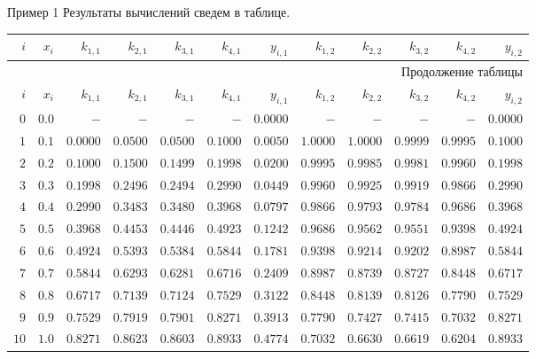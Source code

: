\documentclass[aspectratio=169, mathserif]{beamer}	%
\begin{document}
\begin{frame}[fragile, label=c]{Пример 1}
\scriptsize
Результаты вычислений сведем в таблице.
\vfill
\begin{longtable}{|r|r|r|r|r|r|r|r|r|r|r|r|}

	\hline
	\multicolumn{1}{|r|}{$i$} & \multicolumn{1}{r|}{$x_i$} & \multicolumn{1}{r|}{$k_{1,1}$} & \multicolumn{1}{r|}{$k_{2,1}$} & \multicolumn{1}{r|}{$k_{3,1}$} & \multicolumn{1}{r|}{$k_{4,1}$} & \multicolumn{1}{r|}{$y_{i,1}$} & \multicolumn{1}{r|}{$k_{1,2}$} & \multicolumn{1}{r|}{$k_{2,2}$} & \multicolumn{1}{r|}{$k_{3,2}$} & \multicolumn{1}{r|}{$k_{4,2}$} & \multicolumn{1}{r|}{$y_{i,2}$}  \\
	\hline
	\endfirsthead

	\multicolumn{12}{r}{Продолжение таблицы \thetable{}} \\
	\hline
	\multicolumn{1}{|r|}{$i$} & \multicolumn{1}{r|}{$x_i$} & \multicolumn{1}{r|}{$k_{1,1}$} & \multicolumn{1}{r|}{$k_{2,1}$} & \multicolumn{1}{r|}{$k_{3,1}$} & \multicolumn{1}{r|}{$k_{4,1}$} & \multicolumn{1}{r|}{$y_{i,1}$} & \multicolumn{1}{r|}{$k_{1,2}$} & \multicolumn{1}{r|}{$k_{2,2}$} & \multicolumn{1}{r|}{$k_{3,2}$} & \multicolumn{1}{r|}{$k_{4,2}$} & \multicolumn{1}{r|}{$y_{i,2}$}  \\
	\hline
	\endhead

	$0$ & $0.0$ & $-$ & $-$ & $-$ & $-$ & $0.0000$ & $-$ & $-$ & $-$ & $-$ & $0.0000$\\
	\hline
	$1$ & $0.1$ & $0.0000$ & $0.0500$ & $0.0500$ & $0.1000$ & $0.0050$ & $1.0000$ & $1.0000$ & $0.9999$ & $0.9995$ & $0.1000$\\
	\hline
	$2$ & $0.2$ & $0.1000$ & $0.1500$ & $0.1499$ & $0.1998$ & $0.0200$ & $0.9995$ & $0.9985$ & $0.9981$ & $0.9960$ & $0.1998$\\
	\hline
	$3$ & $0.3$ & $0.1998$ & $0.2496$ & $0.2494$ & $0.2990$ & $0.0449$ & $0.9960$ & $0.9925$ & $0.9919$ & $0.9866$ & $0.2990$\\
	\hline
	$4$ & $0.4$ & $0.2990$ & $0.3483$ & $0.3480$ & $0.3968$ & $0.0797$ & $0.9866$ & $0.9793$ & $0.9784$ & $0.9686$ & $0.3968$\\
	\hline
	$5$ & $0.5$ & $0.3968$ & $0.4453$ & $0.4446$ & $0.4923$ & $0.1242$ & $0.9686$ & $0.9562$ & $0.9551$ & $0.9398$ & $0.4924$\\
	\hline
	$6$ & $0.6$ & $0.4924$ & $0.5393$ & $0.5384$ & $0.5844$ & $0.1781$ & $0.9398$ & $0.9214$ & $0.9202$ & $0.8987$ & $0.5844$\\
	\hline
	$7$ & $0.7$ & $0.5844$ & $0.6293$ & $0.6281$ & $0.6716$ & $0.2409$ & $0.8987$ & $0.8739$ & $0.8727$ & $0.8448$ & $0.6717$\\
	\hline
	$8$ & $0.8$ & $0.6717$ & $0.7139$ & $0.7124$ & $0.7529$ & $0.3122$ & $0.8448$ & $0.8139$ & $0.8126$ & $0.7790$ & $0.7529$\\
	\hline
	$9$ & $0.9$ & $0.7529$ & $0.7919$ & $0.7901$ & $0.8271$ & $0.3913$ & $0.7790$ & $0.7427$ & $0.7415$ & $0.7032$ & $0.8271$\\
	\hline
	$10$ & $1.0$ & $0.8271$ & $0.8623$ & $0.8603$ & $0.8933$ & $0.4774$ & $0.7032$ & $0.6630$ & $0.6619$ & $0.6204$ & $0.8933$\\


\end{longtable}
\end{frame}
\end{document}
